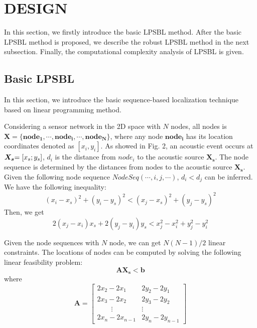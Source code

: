
\section{DESIGN}

In this section, we firstly introduce the basic LPSBL method.
After the basic LPSBL method is proposed, we describe the robust LPSBL method in the next subsection.
Finally, the computational complexity analysis of LPSBL is given.

\subsection{Basic LPSBL}

In this section, we introduce the basic sequence-based localization technique based on linear programming method.

Considering a sensor network in the 2D space with $N$ nodes, all nodes is $\bm{X} = \{ \bm{nod{e_1}}, \cdots ,\bm{nod{e_i}}, \cdots ,\bm{nod{e_N}}\}$, 
where any node $\bm{nod{e_i}}$ has its location coordinates denoted as $[{x_i},{y_i}]$. 
As showed in Fig. 2, an acoustic event occurs at $\bm{X_s}{\rm{ = [}}{x_s};{y_s}]$, ${d_i}$ is the distance from $nod{e_i}$ to the acoustic source $\bm{X_s}$.
The node sequence is determined by the distances from nodes to the acoustic source $\bm{X_s}$.
Given the following node sequence $NodeSeq( \cdots ,i,j, \cdots )$, ${d_i}<{d_j}$ can be inferred. We have the following inequality:
 \begin{equation} \label{equation_1}
(x_i-x_s)^2+(y_i-y_s)^2 < (x_j-x_s)^2+(y_j-y_s)^2
 \end{equation}
Then, we get
\begin{equation} \label{equation_2}
2(x_j-x_i)x_s+2(y_j-y_i)y_s<x_j^2-x_i^2+y_j^2-y_i^2
\end{equation}



Given the node sequences with $N$ node, we can get $N(N - 1)/2$ linear constraints. The
locations of nodes can be computed by solving the following linear feasibility problem:
\begin{equation}
\bm {{A}{X_s}}< \bm{{b}}
\end{equation}
where
\[\bm{A} = 
\left[
\begin{array}{lcr}
2x_2-2x_1 & 2y_2-2y_1 \\
2x_3-2x_2 & 2y_3-2y_2 \\
\quad  \quad      \vdots  &   \vdots  \\
2x_n-2x_{n-1} & 2y_n-2y_{n-1}
\end{array}
\right]
\]

